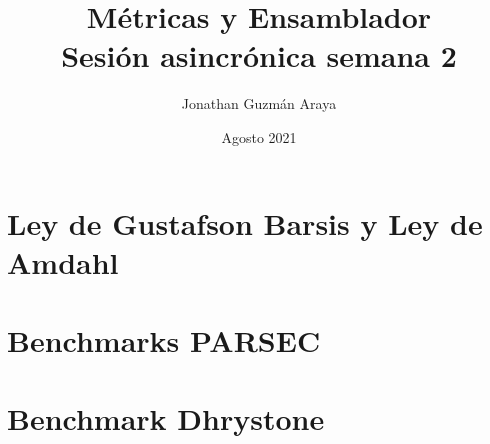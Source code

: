 \documentclass[10pt,a4paper]{article}
\title{%
	Métricas y Ensamblador \\
	\large Sesión asincrónica semana 2  \\}
\author{Jonathan Guzmán Araya}
\date{Agosto 2021}
\begin{document}
	\maketitle
	
	\section{Ley de Gustafson Barsis y Ley de Amdahl}
	
	\section{Benchmarks PARSEC}
	
	\section{Benchmark Dhrystone}
	
\end{document}
